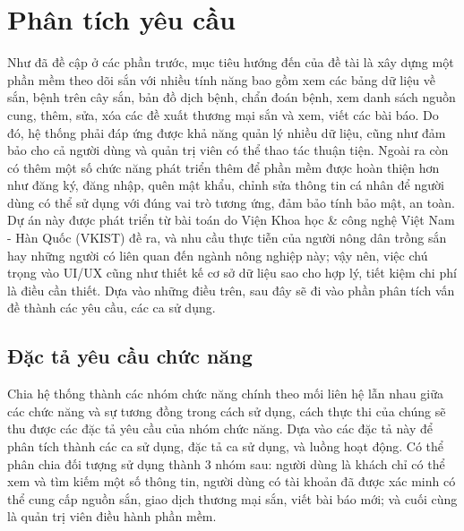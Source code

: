 \documentclass[./../main.tex]{subfiles}
\begin{document}
\section{Phân tích yêu cầu}
Như đã đề cập ở các phần trước, mục tiêu hướng đến của đề tài là xây dựng một phần mềm theo dõi sắn với nhiều tính năng bao gồm xem các bảng dữ liệu về sắn, bệnh trên cây sắn, bản đồ dịch bệnh, chẩn đoán bệnh, xem danh sách nguồn cung, thêm, sửa, xóa các đề xuất thương mại sắn và xem, viết các bài báo. Do đó, hệ thống phải đáp ứng được khả năng quản lý nhiều dữ liệu, cũng như đảm bảo cho cả người dùng và quản trị viên có thể thao tác thuận tiện. Ngoài ra còn có thêm một số chức năng phát triển thêm để phần mềm được hoàn thiện hơn như đăng ký, đăng nhập, quên mật khẩu, chỉnh sửa thông tin cá nhân để người dùng có thể sử dụng với đúng vai trò tương ứng, đảm bảo tính bảo mật, an toàn. Dự án này được phát triển từ bài toán do Viện Khoa học \& công nghệ Việt Nam - Hàn Quốc (VKIST) đề ra, và nhu cầu thực tiễn của người nông dân trồng sắn hay những người có liên quan đến ngành nông nghiệp này; vậy nên, việc chú trọng vào UI/UX cũng như thiết kế cơ sở dữ liệu sao cho hợp lý, tiết kiệm chi phí là điều cần thiết. Dựa vào những điều trên, sau đây sẽ đi vào phần phân tích vấn đề thành các yêu cầu, các ca sử dụng.

\subsection{Đặc tả yêu cầu chức năng}
Chia hệ thống thành các nhóm chức năng chính theo mối liên hệ lẫn nhau giữa các chức năng và sự tương đồng trong cách sử dụng, cách thực thi của chúng sẽ thu được các đặc tả yêu cầu của nhóm chức năng. Dựa vào các đặc tả này để phân tích thành các ca sử dụng, đặc tả ca sử dụng, và luồng hoạt động. Có thể phân chia đối tượng sử dụng thành 3 nhóm sau: người dùng là khách chỉ có thể xem và tìm kiếm một số thông tin, người dùng có tài khoản đã được xác minh có thể cung cấp nguồn sắn, giao dịch thương mại sắn, viết bài báo mới; và cuối cùng là quản trị viên điều hành phần mềm.
\end{document}
